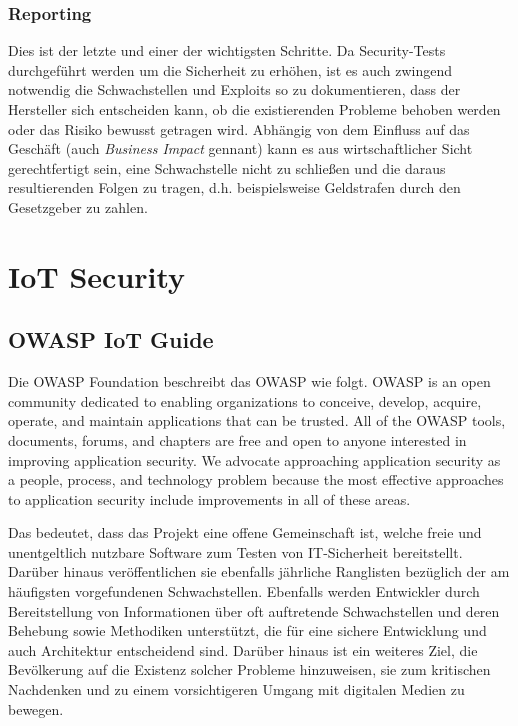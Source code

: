    \subsubsection{\glqq Reporting\grqq{}}
        Dies ist der letzte und einer der wichtigsten Schritte. Da Security-Tests durchgeführt werden um die Sicherheit zu erhöhen, ist es auch zwingend notwendig die Schwachstellen und Exploits so zu dokumentieren, dass der Hersteller sich entscheiden kann, ob die existierenden Probleme behoben werden oder das Risiko bewusst getragen wird. Abhängig von dem Einfluss auf das Geschäft (auch \emph{Business Impact} gennant) kann es aus wirtschaftlicher Sicht gerechtfertigt sein, eine Schwachstelle nicht zu schließen und die daraus resultierenden Folgen zu tragen, d.h. beispielsweise Geldstrafen durch den Gesetzgeber zu zahlen.

\section{IoT Security} \label{IoTSecurity}
    \subsection{OWASP IoT Guide}
        Die OWASP Foundation \cite{guzman_2019} beschreibt das \ac{OWASP} wie folgt.
        \glqq OWASP is an open community dedicated to enabling organizations to conceive, develop, acquire, operate, and maintain applications that can be trusted. All of the OWASP tools, documents, forums, and chapters are free and open to anyone interested in improving application security. We advocate approaching application security as a people, process, and technology problem because the most effective approaches to application security include improvements in all of these areas.\grqq{}
        
        Das bedeutet, dass das Projekt eine offene Gemeinschaft ist, welche freie und unentgeltlich nutzbare Software zum Testen von IT-Sicherheit bereitstellt. Darüber hinaus veröffentlichen sie ebenfalls jährliche Ranglisten bezüglich der am häufigsten vorgefundenen Schwachstellen. Ebenfalls werden Entwickler durch Bereitstellung von Informationen über oft auftretende Schwachstellen und deren Behebung sowie Methodiken unterstützt, die für eine sichere Entwicklung und auch Architektur entscheidend sind. Darüber hinaus ist ein weiteres Ziel, die Bevölkerung auf die Existenz solcher Probleme hinzuweisen, sie zum kritischen Nachdenken und zu einem vorsichtigeren Umgang mit digitalen Medien zu bewegen.
        
